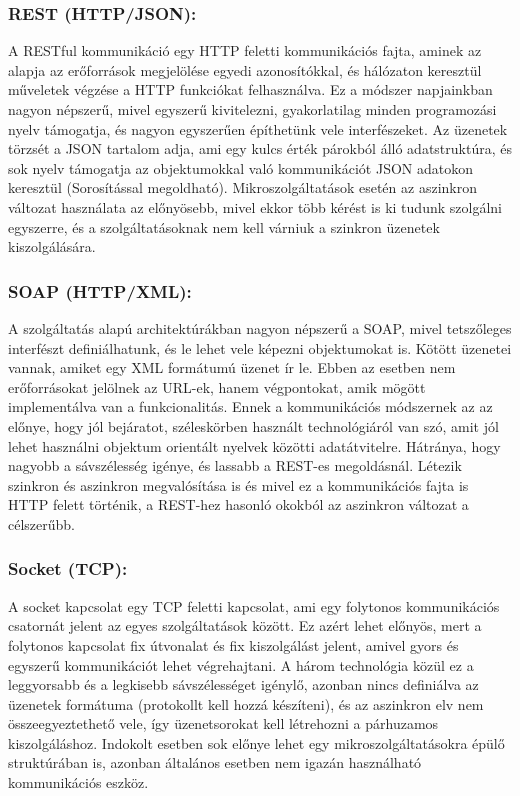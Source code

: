 \documentclass[11pt,magyar,a4paper,twoside,]{report}
\begin{document}
\subsubsection{REST (HTTP/JSON):}\label{rest-httpjson}

A RESTful\citep{microservices-light} kommunikáció egy HTTP feletti
kommunikációs fajta, aminek az alapja az erőforrások megjelölése egyedi
azonosítókkal, és hálózaton keresztül műveletek végzése a HTTP
funkciókat felhasználva. Ez a módszer napjainkban nagyon népszerű, mivel
egyszerű kivitelezni, gyakorlatilag minden programozási nyelv támogatja,
és nagyon egyszerűen építhetünk vele interfészeket. Az üzenetek törzsét
a JSON tartalom adja, ami egy kulcs érték párokból álló adatstruktúra,
és sok nyelv támogatja az objektumokkal való kommunikációt JSON adatokon
keresztül (Sorosítással megoldható). Mikroszolgáltatások esetén az
aszinkron változat használata az előnyösebb\citep{rest-async}, mivel
ekkor több kérést is ki tudunk szolgálni egyszerre, és a
szolgáltatásoknak nem kell várniuk a szinkron üzenetek kiszolgálására.

\subsubsection{SOAP (HTTP/XML):}\label{soap-httpxml}

A szolgáltatás alapú architektúrákban nagyon népszerű a
SOAP\citep{soap}, mivel tetszőleges interfészt definiálhatunk, és le
lehet vele képezni objektumokat is. Kötött üzenetei vannak, amiket egy
XML formátumú üzenet ír le. Ebben az esetben nem erőforrásokat jelölnek
az URL-ek, hanem végpontokat, amik mögött implementálva van a
funkcionalitás. Ennek a kommunikációs módszernek az az előnye, hogy jól
bejáratot, széleskörben használt technológiáról van szó, amit jól lehet
használni objektum orientált nyelvek közötti adatátvitelre. Hátránya,
hogy nagyobb a sávszélesség igénye, és lassabb a REST-es megoldásnál.
Létezik szinkron és aszinkron megvalósítása is és mivel ez a
kommunikációs fajta is HTTP felett történik, a REST-hez hasonló okokból
az aszinkron változat a célszerűbb.

\subsubsection{Socket (TCP):}\label{socket-tcp}

A socket\citep{socket} kapcsolat egy TCP feletti kapcsolat, ami egy
folytonos kommunikációs csatornát jelent az egyes szolgáltatások között.
Ez azért lehet előnyös, mert a folytonos kapcsolat fix útvonalat és fix
kiszolgálást jelent, amivel gyors és egyszerű kommunikációt lehet
végrehajtani. A három technológia közül ez a leggyorsabb és a legkisebb
sávszélességet igénylő, azonban nincs definiálva az üzenetek formátuma
(protokollt kell hozzá készíteni), és az aszinkron elv nem
összeegyeztethető vele, így üzenetsorokat kell létrehozni a párhuzamos
kiszolgáláshoz. Indokolt esetben sok előnye lehet egy
mikroszolgáltatásokra épülő struktúrában is, azonban általános esetben
nem igazán használható kommunikációs eszköz.
\end{document}
